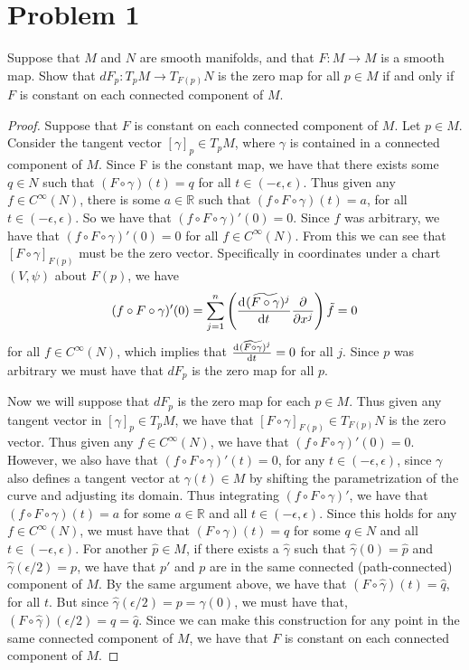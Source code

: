 \documentclass[a4paper]{article}
\begin{document}
\section*{Problem 1}%
Suppose that $M$ and $N$ are smooth manifolds, and that $F: M \rightarrow M$ is a smooth map. Show that $dF_p: T_pM \rightarrow T_{F(p)}N$ is the zero map for all $p \in M$ if and only if $F$ is constant on each connected component of $M$.

\begin{proof}
  Suppose that $F$ is constant on each connected component of $M$. Let $p \in M$. Consider the tangent vector $[\gamma]_p \in T_pM$, where $\gamma$ is contained in a connected component of $M$. Since F is the constant map, we have that there exists some $q \in N$ such that $(F \circ \gamma)(t) = q$ for all $t \in (-\epsilon, \epsilon)$. Thus given any $f \in C^{\infty}(N)$, there is some $a \in \mathds{R}$ such that  $(f \circ F \circ \gamma)(t) = a$, for all $t \in (-\epsilon, \epsilon)$. So we have that $(f \circ F \circ \gamma)'(0) = 0$. Since $f$ was arbitrary, we have that $(f \circ F \circ \gamma)'(0) = 0$ for all $f \in C^{\infty}(N)$. From this we can see that $[F \circ \gamma]_{F(p)}$ must be the zero vector. Specifically in coordinates under a chart $(V, \psi)$ about $F(p)$, we have 
\[
  (f \circ F \circ \gamma)'(0) = \sum_{j=1}^n \left(\dv[]{(\widetilde{F\circ \gamma})^j}{t} \pdv{}{x^j}\right)\tilde{f} = 0
\]
for all $f \in C^{\infty}(N)$, which implies that $\dv[]{(\widetilde{F\circ \gamma})^j}{t} = 0$ for all $j$. Since $p$ was arbitrary we must have that $dF_p$ is the zero map for all $p$.

Now we will suppose that $dF_p$ is the zero map for each $p \in M$. Thus given any tangent vector in $[\gamma]_p \in T_pM$, we have that $[F \circ \gamma]_{F(p)} \in T_{F(p)}N$ is the zero vector. Thus given any $f \in C^{\infty}(N)$, we have that $(f \circ F \circ \gamma)'(0) = 0$. However, we also have that  $(f \circ F \circ \gamma)'(t) = 0$, for any $t \in (-\epsilon, \epsilon)$, since $\gamma$ also defines a tangent vector at $\gamma(t) \in M$ by shifting the parametrization of the curve and adjusting its domain. Thus integrating $(f \circ F \circ \gamma)'$, we have that $(f \circ F \circ \gamma)(t) = a$ for some $a \in \mathds{R}$ and all $t \in (-\epsilon, \epsilon)$. Since this holds for any $f \in C^{\infty}(N)$, we must have that $(F \circ \gamma)(t) = q$ for some $q \in N$ and all $t \in (-\epsilon, \epsilon)$. For another $\hat{p} \in M$, if there exists a $\hat{\gamma}$ such that $\hat{\gamma}(0) = \hat{p}$ and $\hat{\gamma}(\epsilon/2) = p$, we have that $p'$ and $p$ are in the same connected (path-connected) component of $M$. By the same argument above, we have that $(F \circ \hat{\gamma})(t) = \hat{q}$, for all $t$. But since $\hat{\gamma}(\epsilon/2) = p = \gamma(0)$, we must have that, $(F \circ \hat{\gamma})(\epsilon/2) = q = \hat{q}$. Since we can make this construction for any point in the same connected component of $M$, we have that $F$ is constant on each connected component of $M$.
\end{proof}
\end{document}
